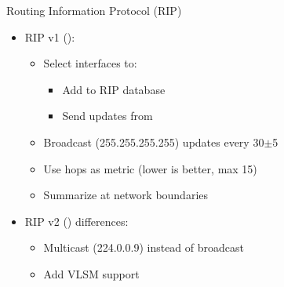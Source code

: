 \begin{frame}{Routing Information Protocol (RIP)}
	\begin{itemize}[<+->]
		\item RIP v1 ():
		\begin{itemize}[<+->]
			\item Select interfaces to:
			\begin{itemize}[<+->]
				\item Add to RIP database
				\item Send updates from
			\end{itemize}
			\item Broadcast (255.255.255.255) updates every 30$\pm$5
			\item Use hops as metric (lower is better, max 15)
			\item Summarize at network boundaries
		\end{itemize}
		\vspace{0.2cm}
		\item RIP v2 () differences:
		\begin{itemize}[<+->]
			\item Multicast (224.0.0.9) instead of broadcast
			\item Add VLSM support
		\end{itemize}
	\end{itemize}
\end{frame}

